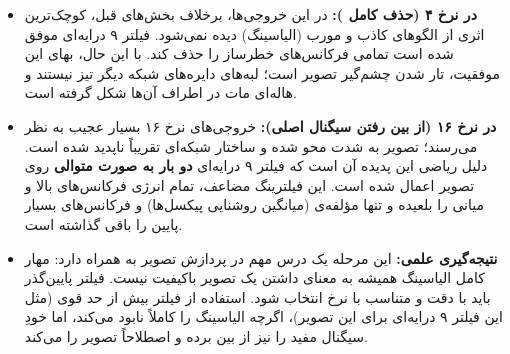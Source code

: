 \begin{itemize}
    \item \textbf{در نرخ ۴ (حذف کامل ):} در این خروجی‌ها، برخلاف بخش‌های قبل، کوچک‌ترین اثری از الگوهای کاذب و مورب (الیاسینگ) دیده نمی‌شود. فیلتر ۹ درایه‌ای موفق شده است تمامی فرکانس‌های خطرساز را حذف کند. با این حال، بهای این موفقیت، تار شدن چشم‌گیر تصویر است؛ لبه‌های دایره‌های شبکه دیگر تیز نیستند و هاله‌ای مات در اطراف آن‌ها شکل گرفته است.
    
    \item \textbf{در نرخ ۱۶ (از بین رفتن سیگنال اصلی):} خروجی‌های نرخ ۱۶ بسیار عجیب به نظر می‌رسند؛ تصویر به شدت محو شده و ساختار شبکه‌ای تقریباً ناپدید شده است. دلیل ریاضی این پدیده آن است که فیلتر ۹ درایه‌ای \textbf{دو بار به صورت متوالی} روی تصویر اعمال شده است. این فیلترینگ مضاعف، تمام انرژی فرکانس‌های بالا و میانی را بلعیده و تنها مؤلفه‌ی  (میانگین روشنایی پیکسل‌ها) و فرکانس‌های بسیار پایین را باقی گذاشته است.
    
    \item \textbf{نتیجه‌گیری علمی:} این مرحله یک درس مهم در پردازش تصویر به همراه دارد: مهار کامل الیاسینگ همیشه به معنای داشتن یک تصویر باکیفیت نیست. فیلتر پایین‌گذر باید با دقت و متناسب با نرخ  انتخاب شود. استفاده از فیلتر بیش از حد قوی (مثل این فیلتر ۹ درایه‌ای برای این تصویر)، اگرچه الیاسینگ را کاملاً نابود می‌کند، اما خودِ سیگنال مفید را نیز از بین برده و اصطلاحاً تصویر را  می‌کند.
\end{itemize}